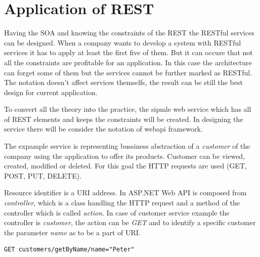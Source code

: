 \bigskip
\section{Application of REST}

Having the SOA and knowing the constraints of the REST the RESTful services can be designed. When a company wants to develop a system with RESTful services it has to apply at least the first five of them. But it can occure that not all the constraints are profitable for an application. In this case the architecture can forget some of them but the services cannot be further marked as RESTful. The notation doesn't affect services themselfs, the result can be still the best design for current application.

To convert all the theory into the practice, the sipmle web service which has all of REST elements and keeps the constraints will be created. In designing the service there will be consider the notation of \gls{webapi} \gls{framework}. 

The expample service is representing bussiness abstraction of a \emph{customer} of the company using the application to offer its products. Customer can be viewed, created, modified or deleted. For this goal the HTTP requests are used (GET, POST, PUT, DELETE). 

Resource identifier is a URI address. In ASP.NET Web API is composed from \emph{controller}, which is a class handling the HTTP request and a method of the controller which is called \emph{action}. In case of customer service example the controller is \emph{customer}, the action can be \emph{GET} and to identify a specific customer the parameter \emph{name} as to be a part of URI.


\begin{lstlisting}
GET customers/getByName/name="Peter"
\end{lstlisting}




